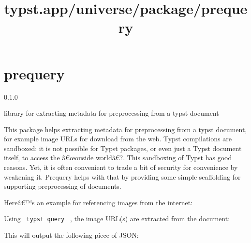 \title{typst.app/universe/package/prequery}

\label{banner}
\section{prequery}\label{prequery}

{ 0.1.0 }

library for extracting metadata for preprocessing from a typst document

\label{readme}
This package helps extracting metadata for preprocessing from a typst
document, for example image URLs for download from the web. Typst
compilations are sandboxed: it is not possible for Typst packages, or
even just a Typst document itself, to access the â€œouside worldâ€?.
This sandboxing of Typst has good reasons. Yet, it is often convenient
to trade a bit of security for convenience by weakening it. Prequery
helps with that by providing some simple scaffolding for supporting
preprocessing of documents.

Hereâ€™s an example for referencing images from the internet:

\begin{Shaded}
\begin{Highlighting}[]


\end{Highlighting}
\end{Shaded}

Using \texttt{\ typst\ query\ } , the image URL(s) are extracted from
the document:

\begin{Shaded}
\begin{Highlighting}[]
\DataTypeTok{\textbackslash{}}
\StringTok{\textquotesingle{}\textquotesingle{}}
\end{Highlighting}
\end{Shaded}

This will output the following piece of JSON:

